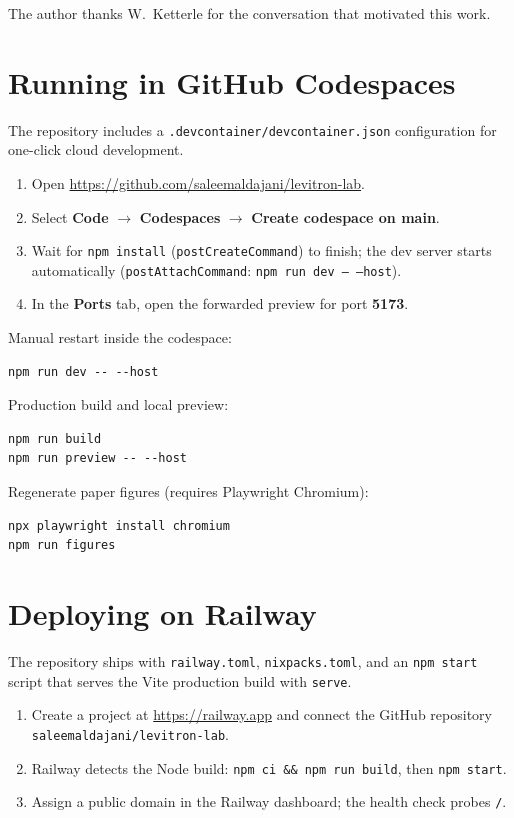 \documentclass[aapm,ajp,amsmath,amssymb,reprint]{revtex4-2}
\begin{document}
\begin{acknowledgments}
The author thanks W.~Ketterle for the conversation that motivated this work.
\end{acknowledgments}

\appendix

\section{Running in GitHub Codespaces}
\label{app:codespaces}

The repository includes a \texttt{.devcontainer/devcontainer.json} configuration for one-click cloud development.

\begin{enumerate}
\item Open \url{https://github.com/saleemaldajani/levitron-lab}.
\item Select \textbf{Code} $\rightarrow$ \textbf{Codespaces} $\rightarrow$ \textbf{Create codespace on main}.
\item Wait for \texttt{npm install} (\texttt{postCreateCommand}) to finish; the dev server starts automatically (\texttt{postAttachCommand}: \texttt{npm run dev -- --host}).
\item In the \textbf{Ports} tab, open the forwarded preview for port \textbf{5173}.
\end{enumerate}

Manual restart inside the codespace:
\begin{verbatim}
npm run dev -- --host
\end{verbatim}
Production build and local preview:
\begin{verbatim}
npm run build
npm run preview -- --host
\end{verbatim}
Regenerate paper figures (requires Playwright Chromium):
\begin{verbatim}
npx playwright install chromium
npm run figures
\end{verbatim}

\section{Deploying on Railway}
\label{app:railway}

The repository ships with \texttt{railway.toml}, \texttt{nixpacks.toml}, and an \texttt{npm start} script that serves the Vite production build with \texttt{serve}.

\begin{enumerate}
\item Create a project at \url{https://railway.app} and connect the GitHub repository \texttt{saleemaldajani/levitron-lab}.
\item Railway detects the Node build: \texttt{npm ci \&\& npm run build}, then \texttt{npm start}.
\item Assign a public domain in the Railway dashboard; the health check probes \texttt{/}.
\end{enumerate}
\end{document}
